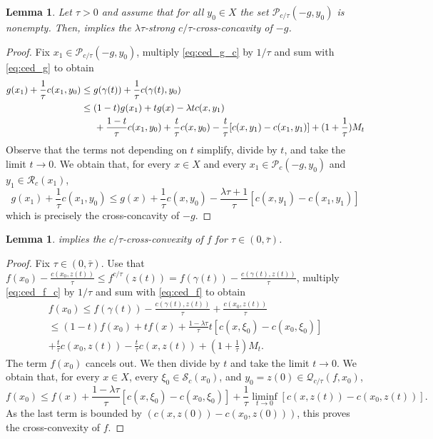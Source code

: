 \documentclass[reqno]{amsart}
\newcounter{results}[section]
\theoremstyle{plain}
\newtheorem{lemma}[results]{Lemma}
\theoremstyle{remark}
\theoremstyle{plain}
\numberwithin{equation}{section}
\theoremstyle{remark}
\newcommand{\calP}{\mathcal{P}}
\newcommand{\calQ}{\mathcal{Q}}
\newcommand{\YY}{X}
\begin{document}
\begin{lemma}\label{lem:ced_cross-concave}
     Let $\tau >0$ and assume that for all $y_0\in \YY$ the set $\calP_{c/\tau}(-g,y_0)$ is nonempty. Then,  implies the $\lambda\tau$-strong $c/\tau$-cross-concavity of $-g$.
\end{lemma}
\begin{proof}
    Fix $ x_1 \in \calP_{c/\tau}(-g,y_0)$, multiply \eqref{eq:ced_g_c} by $1/\tau$ and sum with \eqref{eq:ced_g} to obtain
    \begin{align}
        g(x_1) +\frac{1}{\tau}c(x_1,y_0) \nonumber
        &\le g(\gamma(t)) +\frac{1}{\tau}c(\gamma(t),y_0)\\
        &\le (1-t)g(x_1)+tg(x)-\lambda t c(x,y_1) \nonumber \\
        &\hspace{5mm}+\frac{1-t}{\tau}c(x_1,y_0)+\frac{t}{\tau}c(x,y_0)- \frac{t}{\tau} [c(x,y_1)- c(x_1,y_1)]+(1+\frac{1}{\tau})M_t
    \end{align}
    Observe that the terms not depending on $t$ simplify, divide by $t$, and take the limit $t\to 0$. We obtain that, for every $x\in X$ and every $x_1 \in \mathcal{P}_c(-g,y_0)$  and   $y_1 \in \mathcal{R}_c(x_1)$,
    \begin{equation}
        g(x_1) +\frac{1}{\tau}c(x_1,y_0)\le g(x)+\frac{1}{\tau}c(x,y_0)-\frac{\lambda\tau+1}{\tau}[c(x,y_1)- c(x_1,y_1)]
    \end{equation}
    which is precisely the cross-concavity of $-g$.
\end{proof}

\begin{lemma}\label{lem:ced_cross-convex}
     implies the $c/\tau$-cross-convexity of $f$ for $\tau \in (0,\bar{\tau})$.
\end{lemma}
\begin{proof}
    Fix $\tau \in (0,\bar{\tau})$. Use that $f(x_0)-\frac{c(x_0,z(t))}{\tau}\le f^{c/\tau}(z(t))=f(\gamma(t))-\frac{c(\gamma(t),z(t))}{\tau}$, multiply \eqref{eq:ced_f_c} by $1/\tau$ and sum with \eqref{eq:ced_f} to obtain
    \begin{multline}
    f(x_0)\le 
        f(\gamma(t))-\frac{c(\gamma(t),z(t))}{\tau}+\frac{c(x_0,z(t))}{\tau}\\
        \le (1-t)f(x_0)+tf(x)+\frac{1-\lambda\tau}{\tau} t[c(x,\xi_0)-c(x_0,\xi_0)]\\
        +\frac{t}{\tau}c(x_0,z(t))-\frac{t}{\tau}c(x,z(t))+(1+\frac{1}{\tau})M_t.
    \end{multline}
    The term $f(x_0)$ cancels out. We then divide by $t$ and take the limit $t\to 0$. We obtain that, for every $x \in X$, every $\xi_0\in \mathcal{S}_c(x_0)$,  and  $y_0=z(0) \in \calQ_{c/\tau}(f,x_0)$,
    \begin{equation}
        f(x_0)\le f(x)+\frac{1-\lambda\tau}{\tau}[c(x,\xi_0)-c(x_0,\xi_0)]+\frac{1}{\tau}\liminf_{t\to 0}[c(x,z(t))-c(x_0,z(t))].
    \end{equation}
  As  the last term is bounded by $( c(x,z(0))-c(x_0,z(0)))$,  this proves  the cross-convexity of $f$.
\end{proof}
\end{document}
